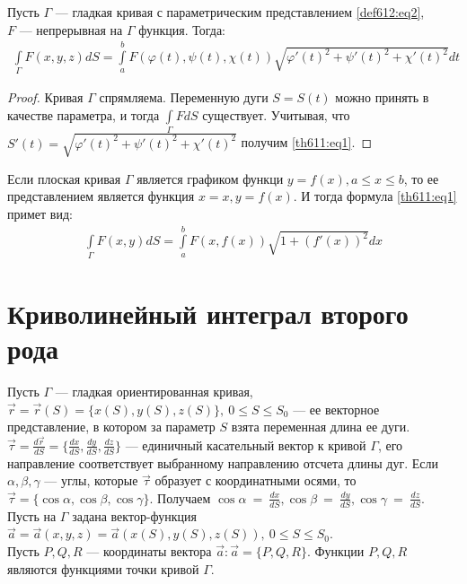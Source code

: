 \begin{theorem}
  Пусть $\Gamma$ --- гладкая кривая с параметрическим представлением
  \eqref{def612:eq2},\\ $F$ --- непрерывная на $\Gamma$ функция. Тогда:
  \begin{gather}
    \int\limits_\Gamma F(x, y, z) dS = \int\limits_a^b F(\varphi(t), \psi(t),
    \chi(t)) \sqrt{\varphi'(t)^2 + \psi'(t)^2 + \chi'(t)^2} dt
    \label{th611:eq1}
  \end{gather}
\end{theorem}

\begin{proof}
  Кривая $\Gamma$ спрямляема. Переменную дуги $S = S(t)$ можно принять в
  качестве параметра, и тогда $\int\limits_\Gamma FdS$ существует. Учитывая,
  что $S'(t) = \sqrt{\varphi'(t)^2 + \psi'(t)^2 + \chi'(t)^2}$ получим
  \eqref{th611:eq1}.
\end{proof}

\begin{remark}
  Если плоская кривая $\Gamma$ является графиком функци $y = f(x), a \leq x
  \leq b$, то ее представлением является функция $x = x, y = f(x)$. И тогда
  формула \eqref{th611:eq1} примет вид:
  \begin{gather*}
    \int\limits_\Gamma F(x, y) dS = \int\limits_a^b F(x, f(x)) \sqrt{1 +
    (f'(x))^2} dx
  \end{gather*}
\end{remark}

\section{Криволинейный интеграл второго рода}

Пусть $\Gamma$ --- гладкая ориентированная кривая,\\ $\vec{r} = \vec{r}(S) =
\{x(S), y(S), z(S)\}, \ 0 \leq S \leq S_0$ --- ее векторное представление, в
котором за параметр $S$ взята переменная длина ее дуги. $\vec{\tau} =
\frac{d \vec{r}}{dS} = \{\frac{dx}{dS}, \frac{dy}{dS}, \frac{dz}{dS}\}$ ---
единичный касательный вектор к кривой $\Gamma$, его направление соответствует
выбранному направлению отсчета длины дуг. Если $\alpha, \beta, \gamma$ ---
углы, которые $\vec\tau$ образует с координатными осями, то $\vec\tau = \{\cos
\alpha, \cos \beta, \cos \gamma\}$. Получаем $\cos \alpha~=~\frac{dx}{dS}, \cos
\beta~=~\frac{dy}{dS}, \cos \gamma~=~\frac{dz}{dS}$. \\

Пусть на $\Gamma$ задана вектор-функция $\vec a = \vec a(x, y, z) = \vec
a(x(S), y(S), z(S)), \ 0 \leq S \leq S_0$. \\ Пусть $P, Q, R$ --- координаты
вектора $\vec a : \vec a = \{P, Q, R\}$. Функции $P, Q, R$ являются функциями
точки кривой $\Gamma$.

